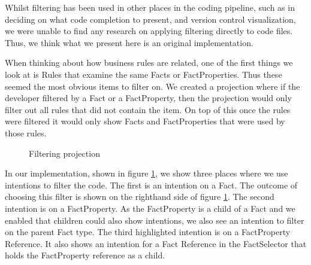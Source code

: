 Whilst filtering has been used in other places in the coding pipeline, such as in deciding on what code completion to present\cite{hou2010towards}, and version control visualization\cite{yoon2013visualization}, we were unable to find any research on applying filtering directly to code files.
Thus, we think what we present here is an original implementation.

When thinking about how business rules are related, one of the first things we look at is Rules that examine the same Facts or FactProperties.
Thus these seemed the most obvious items to filter on.
We created a projection where if the developer filtered by a Fact or a FactProperty, then the projection would only filter out all rules that did not contain the item.
On top of this once the rules were filtered it would only show Facts and FactProperties that were used by those rules.

\begin{figure}[h]
    \centering
    \caption{Filtering projection}
    \label{fig:filteringProjection}
\end{figure}

In our implementation, shown in figure \ref{fig:filteringProjection}, we show three places where we use intentions to filter the code.
The first is an intention on a Fact.
The outcome of choosing this filter is shown on the righthand side of figure \ref{fig:filteringProjection}.
The second intention is on a FactProperty.
As the FactProperty is a child of a Fact and we enabled that children could also show intentions, we also see an intention to filter on the parent Fact type.
The third highlighted intention is on a FactProperty Reference.
It also shows an intention for a Fact Reference in the FactSelector that holds the FactProperty reference as a child.

